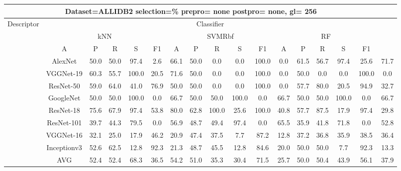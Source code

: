 \documentclass[12pt,italian]{article}
\begin{document}
\begin{tiny}
\begin{longtable}{lcccccccccccccccc}
\toprule
\multicolumn{16}{c}{Dataset=ALLIDB2 selection=\% prepro= none postpro= none, gl= 256} \\ 
\toprule
Descriptor & \multicolumn{15}{c}{Classifier} \\ 
& \multicolumn{5}{c}{kNN} & \multicolumn{5}{c}{SVMRbf} & \multicolumn{5}{c}{RF} \\ 
& A & P & R & S & F1 & A & P & R & S & F1 & A & P & R & S & F1 \\ 
\midrule
& AlexNet & 50.0 & 50.0 & 97.4 &  2.6 & 66.1 & 50.0 &  0.0 &  0.0 & 100.0 &  0.0 & 61.5 & 56.7 & 97.4 & 25.6 & 71.7 \\ 
& VGGNet-19 & 60.3 & 55.7 & 100.0 & 20.5 & 71.6 & 50.0 &  0.0 &  0.0 & 100.0 &  0.0 & 50.0 &  0.0 &  0.0 & 100.0 &  0.0 \\ 
& ResNet-50 & 59.0 & 64.0 & 41.0 & 76.9 & 50.0 & 50.0 &  0.0 &  0.0 & 100.0 &  0.0 & 57.7 & 80.0 & 20.5 & 94.9 & 32.7 \\ 
& GoogleNet & 50.0 & 50.0 & 100.0 &  0.0 & 66.7 & 50.0 & 50.0 & 100.0 &  0.0 & 66.7 & 50.0 & 50.0 & 100.0 &  0.0 & 66.7 \\ 
& ResNet-18 & 75.6 & 67.9 & 97.4 & 53.8 & 80.0 & 62.8 & 100.0 & 25.6 & 100.0 & 40.8 & 57.7 & 87.5 & 17.9 & 97.4 & 29.8 \\ 
& ResNet-101 & 39.7 & 44.3 & 79.5 &  0.0 & 56.9 & 48.7 & 49.4 & 97.4 &  0.0 & 65.5 & 35.9 & 41.8 & 71.8 &  0.0 & 52.8 \\ 
& VGGNet-16 & 32.1 & 25.0 & 17.9 & 46.2 & 20.9 & 47.4 & 37.5 &  7.7 & 87.2 & 12.8 & 37.2 & 36.8 & 35.9 & 38.5 & 36.4 \\ 
& Inceptionv3 & 52.6 & 62.5 & 12.8 & 92.3 & 21.3 & 48.7 & 45.5 & 12.8 & 84.6 & 20.0 & 50.0 & 50.0 &  7.7 & 92.3 & 13.3 \\ 
\hline
& AVG & 52.4 & 52.4 & 68.3 & 36.5 & 54.2 & 51.0 & 35.3 & 30.4 & 71.5 & 25.7 & 50.0 & 50.4 & 43.9 & 56.1 & 37.9 \\ 
\hline
\bottomrule
\end{longtable} 

 \pagebreak 
\end{tiny} 
 
\end{document}
